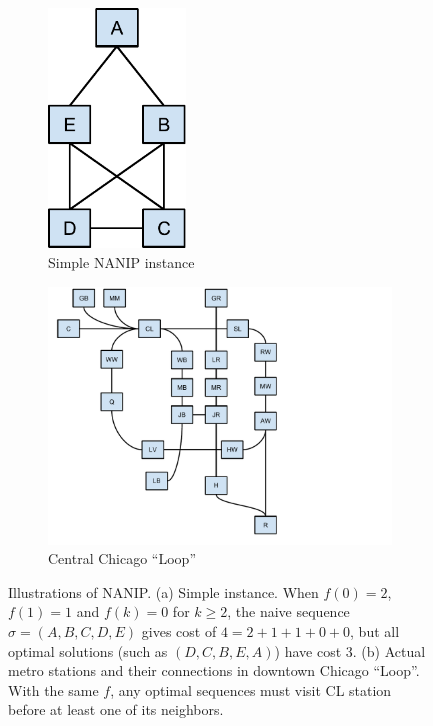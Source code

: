 \begin{figure}[th]
\begin{subfigure}[b]{0.4\textwidth}
\centering
\includegraphics[width=0.4\textwidth]{figures/simple}
\caption{Simple NANIP instance}
\end{subfigure}%
\begin{subfigure}[b]{0.6\textwidth}
\centering
\includegraphics[width=\textwidth]{figures/Chicago_Loop_schematic} 
\caption{Central Chicago ``Loop''}
\end{subfigure}
\caption{Illustrations of NANIP.
(a) Simple instance.  
When $f(0)=2$, $f(1)=1$ and $f(k)=0$ for $k\ge2$, the naive sequence
$\sigma=(A,B,C,D,E)$ gives cost of $4=2+1+1+0+0$, but all optimal solutions
(such as $(D,C,B,E,A)$) have cost $3$.\label{fig:illustration} (b) Actual metro
stations and their connections in downtown Chicago ``Loop''.  With the same
$f$, any optimal sequences must visit CL station before at least one of its
neighbors.}
\end{figure}

